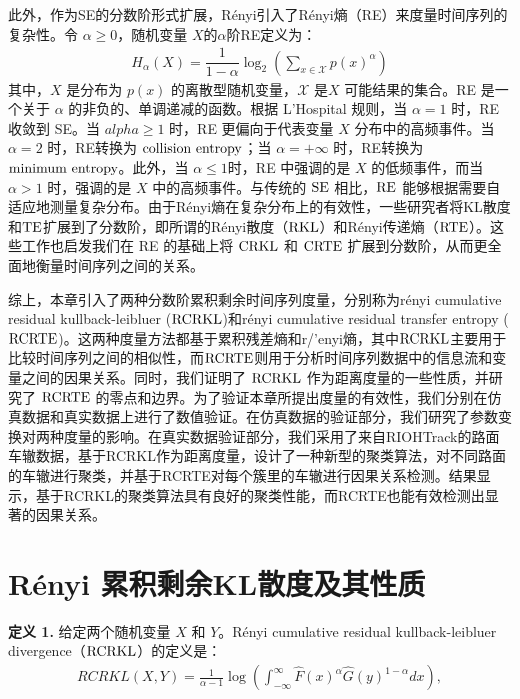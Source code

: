 此外，作为SE的分数阶形式扩展，R{\'e}nyi引入了R{\'e}nyi熵（RE）来度量时间序列的复杂性\cite{21}。令 $\alpha \geq 0$，随机变量 $X$的$\alpha$阶RE定义为：
\begin{align}\label{RE}
H_{\alpha}(X) = \dfrac{1}{1 - \alpha} \log_2 \left(\sum_{x \in \mathcal{X}} p(x)^{\alpha} \right)
\end{align}
其中，$X$ 是分布为 $p(x)$ 的离散型随机变量，$\mathcal{X}$ 是$X$ 可能结果的集合。RE 是一个关于 $\alpha$ 的非负的、单调递减的函数\cite{22}。根据 L'Hospital 规则，当 $\alpha=1$ 时，RE 收敛到 SE。当 $alpha \geq 1$ 时，RE 更偏向于代表变量 $X$ 分布中的高频事件。当 $\alpha=2$ 时，RE转换为 $\rm{collision\ entropy}$；当 $\alpha=+\infty$ 时，RE转换为 $\rm{minimum\ entropy}$。此外，当 $\alpha \leq 1$时，RE 中强调的是 $X$ 的低频事件，而当 $\alpha > 1$ 时，强调的是 $X$ 中的高频事件\cite{23}。与传统的 $\rm{SE}$ 相比，$\rm{RE}$ 能够根据需要自适应地测量复杂分布。由于R\'{e}nyi熵在复杂分布上的有效性，一些研究者将KL散度和$\rm{TE}$扩展到了分数阶\cite{24,25}，即所谓的R\'{e}nyi散度（$\rm{RKL}$）和R\'{e}nyi传递熵（$\rm{RTE}$）。这些工作也启发我们在 RE 的基础上将 $\rm{CRKL}$ 和 $\rm{CRTE}$ 扩展到分数阶，从而更全面地衡量时间序列之间的关系。

综上，本章引入了两种分数阶累积剩余时间序列度量，分别称为r\'{e}nyi cumulative residual kullback-leibluer ($\rm{RCRKL}$)和r\'{e}nyi cumulative residual transfer entropy ($\rm{RCRTE}$)。这两种度量方法都基于累积残差熵和r/'{e}nyi熵，其中$\rm{RCRKL}$主要用于比较时间序列之间的相似性，而$\rm{RCRTE}$则用于分析时间序列数据中的信息流和变量之间的因果关系。同时，我们证明了 $\rm{RCRKL}$ 作为距离度量的一些性质，并研究了 $\rm{RCRTE}$ 的零点和边界。为了验证本章所提出度量的有效性，我们分别在仿真数据和真实数据上进行了数值验证。在仿真数据的验证部分，我们研究了参数变换对两种度量的影响。在真实数据验证部分，我们采用了来自RIOHTrack的路面车辙数据，基于RCRKL作为距离度量，设计了一种新型的聚类算法，对不同路面的车辙进行聚类，并基于RCRTE对每个簇里的车辙进行因果关系检测。结果显示，基于RCRKL的聚类算法具有良好的聚类性能，而RCRTE也能有效检测出显著的因果关系。

\section{R\'{e}nyi 累积剩余KL散度及其性质}

\textbf{定义 1.} 给定两个随机变量 $X$ 和 $Y$。R\'{e}nyi cumulative residual kullback-leibluer divergence（$\rm{RCRKL}$）的定义是：
\begin{align}
RCRKL(X,Y)=\frac{1}{\alpha-1} \log \left( \int_{-\infty}^{\infty} \hat F(x)^{\alpha} \hat G(y)^{1-\alpha} dx \right),
\end{align}

